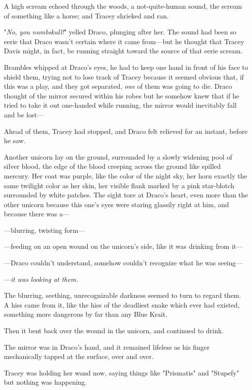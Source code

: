 A high scream echoed through the woods, a not-quite-human sound, the scream of 
something like a horse; and Tracey shrieked and ran.

"\emph{No, you numbskull!}" yelled Draco, plunging after her. The sound had 
been so eerie that Draco wasn't certain where it came from---but he thought 
that Tracey Davis might, in fact, be running straight toward the source of that 
eerie scream.

Brambles whipped at Draco's eyes, he had to keep one hand in front of his face 
to shield them, trying not to lose track of Tracey because it seemed obvious 
that, if this was a play, and they got separated, \emph{one} of them was going 
to die. Draco thought of the mirror secured within his robes but he somehow 
knew that if he tried to take it out one-handed while running, the mirror would 
inevitably fall and be lost---

Ahead of them, Tracey had stopped, and Draco felt relieved for an instant, 
before he saw.

Another unicorn lay on the ground, surrounded by a slowly widening pool of 
silver blood, the edge of the blood creeping across the ground like spilled 
mercury. Her coat was purple, like the color of the night sky, her horn exactly 
the same twilight color as her skin, her visible flank marked by a pink 
star-blotch surrounded by white patches. The sight tore at Draco's heart, even 
more than the other unicorn because this one's eyes were staring glassily right 
at him, and because there was a---

---blurring, twisting form---

---feeding on an open wound on the unicorn's side, like it was drinking from 
it---

---Draco couldn't understand, somehow couldn't recognize what he was seeing---

---\emph{it was looking at them.}

The blurring, seething, unrecognizable darkness seemed to turn to regard them. 
A hiss came from it, like the hiss of the deadliest snake which ever had 
existed, something more dangerous by far than any Blue Krait.

Then it bent back over the wound in the unicorn, and continued to drink.

The mirror was in Draco's hand, and it remained lifeless as his finger 
mechanically tapped at the surface, over and over.

Tracey was holding her wand now, saying things like "Prismatis" and "Stupefy" 
but nothing was happening.


